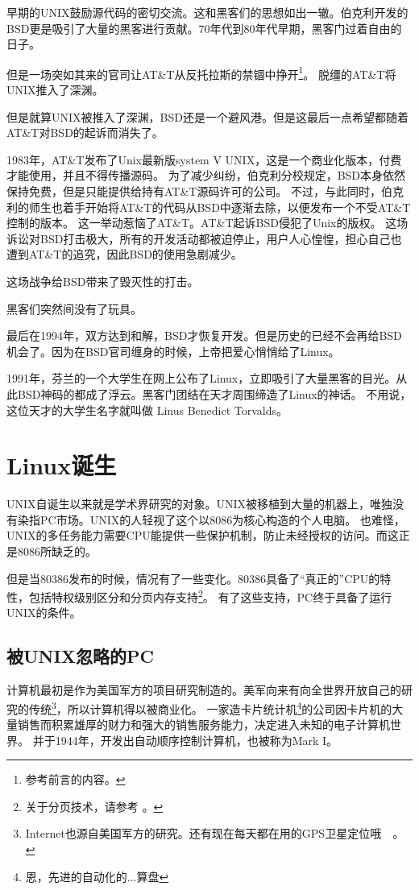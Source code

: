 早期的UNIX鼓励源代码的密切交流。这和黑客们的思想如出一辙。伯克利开发的BSD更是吸引了大量的黑客进行贡献。70年代到80年代早期，黑客门过着自由的日子。


但是一场突如其来的官司让AT\&T从反托拉斯的禁锢中挣开\footnote{参考前言的内容。}。
脱缰的AT\&T将UNIX推入了深渊。

但是就算UNIX被推入了深渊，BSD还是一个避风港。但是这最后一点希望都随着AT\&T对BSD的起诉而消失了。

1983年，AT\&T发布了Unix最新版system V UNIX，这是一个商业化版本，付费才能使用，并且不得传播源码。
为了减少纠纷，伯克利分校规定，BSD本身依然保持免费，但是只能提供给持有AT\&T源码许可的公司。
不过，与此同时，伯克利的师生也着手开始将AT\&T的代码从BSD中逐渐去除，以便发布一个不受AT\&T控制的版本。
这一举动惹恼了AT\&T。AT\&T起诉BSD侵犯了Unix的版权。
这场诉讼对BSD打击极大，所有的开发活动都被迫停止，用户人心惶惶，担心自己也遭到AT\&T的追究，因此BSD的使用急剧减少。

这场战争给BSD带来了毁灭性的打击。


黑客们突然间没有了玩具。

最后在1994年，双方达到和解，BSD才恢复开发。但是历史的已经不会再给BSD机会了。因为在BSD官司缠身的时候，上帝把爱心悄悄给了Linux。

1991年，芬兰的一个大学生在网上公布了Linux，立即吸引了大量黑客的目光。从此BSD神码的都成了浮云。黑客门团结在天才周围缔造了Linux的神话。
不用说，这位天才的大学生名字就叫做 Linus Benedict Torvalds。

\section{Linux诞生}

UNIX自诞生以来就是学术界研究的对象。UNIX被移植到大量的机器上，唯独没有染指PC市场。UNIX的人轻视了这个以8086为核心构造的个人电脑。
也难怪，UNIX的多任务能力需要CPU能提供一些保护机制，防止未经授权的访问。而这正是8086所缺乏的。

但是当80386发布的时候，情况有了一些变化。80386具备了“真正的”CPU的特性，包括特权级别区分和分页内存支持\footnote{关于分页技术，请参考 。}。 有了这些支持，PC终于具备了运行UNIX的条件。

\subsection{被UNIX忽略的PC}
计算机最初是作为美国军方的项目研究制造的。美军向来有向全世界开放自己的研究的传统\footnote{Internet也源自美国军方的研究。还有现在每天都在用的GPS卫星定位哦~~。}，所以计算机得以被商业化。
一家造卡片统计机\footnote{恩，先进的自动化的...算盘}的公司因卡片机的大量销售而积累雄厚的财力和强大的销售服务能力，决定进入未知的电子计算机世界。
并于1944年，开发出自动顺序控制计算机，也被称为Mark  I。

